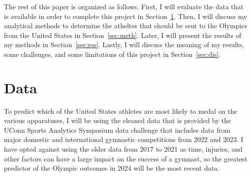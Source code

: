 \documentclass[12pt]{article}
\begin{document}
The rest of this paper is organized as follows. First, I will evaluate the data that is available in order to complete 
this project in Section~\ref{sec:data}. Then, I will discuss my 
analytical methods to determine the atheltes that should be sent to the Olympics from the United States 
in Section~\ref{sec:meth}. Later, I will present the results of my 
methods in Section~\ref{sec:res}. Lastly, I will discuss the meaning of my results, some challenges, 
and some limitations of this project in Section~\ref{sec:dis}.


\section{Data}
\label{sec:data}

To predict which of the United States athletes are most likely to medal on the various apparatuses, 
I will be using the cleaned data that is provided by the UConn Sports Analytics Symposium data challenge 
that includes data from major domestic and international gymnastic competitions from 2022 and 2023. 
I have opted against using the older data from 2017 to 2021 as time, injuries, 
and other factors can have a large impact on the success of a gymnast, so the greatest predictor
of the Olympic outcomes in 2024 will be the most recent data.
\end{document}
